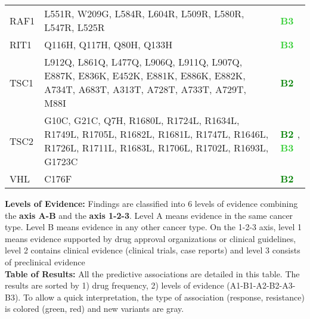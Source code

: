\documentclass[9pt]{article}\usepackage[]{graphicx}\usepackage[table,dvipsnames]{xcolor}
\begin{document}
\begin{longtable}{p{0.6in}p{2.0in}p{0.8in}}
  RAF1 & L551R, W209G, L584R, L604R, L509R, L580R, L547R, L525R & \textbf{\textcolor{LimeGreen}{ B3 }} \\ 
  RIT1 & Q116H, Q117H, Q80H, Q133H & \textbf{\textcolor{LimeGreen}{ B3 }} \\ 
  TSC1 & L912Q, L861Q, L477Q, L906Q, L911Q, L907Q, E887K, E836K, E452K, E881K, E886K, E882K, A734T, A683T, A313T, A728T, A733T, A729T, M88I & \textbf{\textcolor{Green}{ B2 }} \\ 
  TSC2 & G10C, G21C, Q7H, R1680L, R1724L, R1634L, R1749L, R1705L, R1682L, R1681L, R1747L, R1646L, R1726L, R1711L, R1683L, R1706L, R1702L, R1693L, G1723C & \textbf{\textcolor{Green}{ B2 }},\textbf{\textcolor{LimeGreen}{ B3 }} \\ 
  VHL & C176F & \textbf{\textcolor{Green}{ B2 }} \\ 
   \hline
\hline
\end{longtable}
\endgroup





\textbf{Levels of Evidence:} Findings are classified into 6 levels of evidence combining the \textbf{axis A-B} and the \textbf{axis 1-2-3}. Level A means evidence in the same cancer type. Level B means evidence in any other cancer type. On the 1-2-3 axis, level 1 means evidence supported by drug approval organizations or clinical guidelines, level 2 contains clinical evidence (clinical trials, case reports) and level 3 consists of preclinical evidence\\


\textbf{Table of Results:} All the predictive associations are detailed in this table. The results are sorted by 1) drug frequency, 2) levels of evidence (A1-B1-A2-B2-A3-B3). To allow a quick interpretation, the type of association (response, resistance) is colored (green, red) and new variants are gray. 
\end{document}
